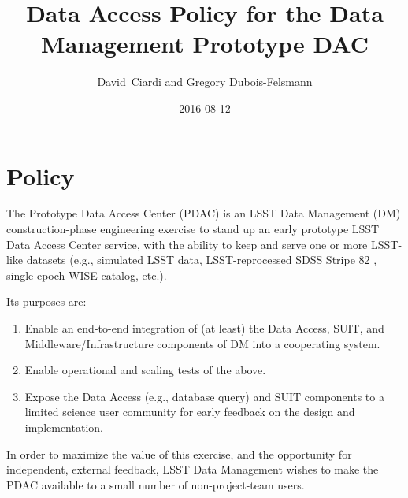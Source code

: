 \documentclass[DM,lsstdraft,toc]{lsstdoc}
\title[Data Access Policy for PDAC]{Data Access Policy for the Data Management Prototype DAC}
\author{David~Ciardi and Gregory Dubois-Felsmann}
\date{2016-08-12}
\begin{document}
\maketitle

\section{Policy}

The Prototype Data Access Center (PDAC) is an LSST Data Management (DM) construction-phase engineering exercise to stand up an early prototype LSST Data Access Center service, with the ability to keep and serve one or more LSST-like datasets (e.g., simulated LSST data, LSST-reprocessed SDSS Stripe 82 \citep{Document-15097}, single-epoch WISE catalog, etc.).

Its purposes are:

\begin{enumerate}
\item Enable an end-to-end integration of (at least) the Data Access, SUIT, and Middleware/Infrastructure components of DM into a cooperating system.

\item Enable operational and scaling tests of the above.

\item Expose the Data Access (e.g., database query) and SUIT components to a limited science user community for early feedback on the
design and implementation.
\end{enumerate}

In order to maximize the value of this exercise, and the opportunity for independent, external feedback, LSST Data Management wishes to make the PDAC available to a small number of non-project-team users.
\end{document}
